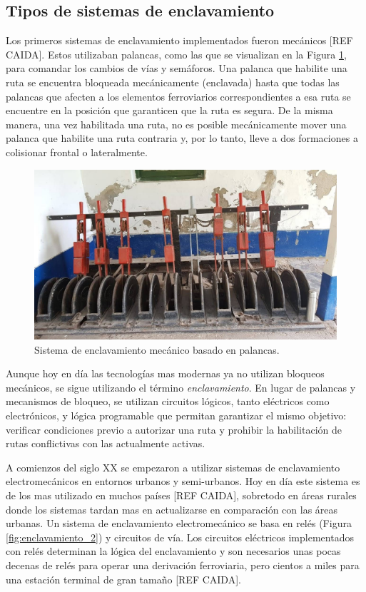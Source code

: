 \subsection{Tipos de sistemas de enclavamiento}

    Los primeros sistemas de enclavamiento implementados fueron mecánicos [REF CAIDA]. Estos utilizaban palancas, como las que se visualizan en la Figura \ref{fig:enclavamiento_1}, para comandar los cambios de vías y semáforos. Una palanca que habilite una ruta se encuentra bloqueada mecánicamente (enclavada) hasta que todas las palancas que afecten a los elementos ferroviarios correspondientes a esa ruta se encuentre en la posición que garanticen que la ruta es segura. De la misma manera, una vez habilitada una ruta, no es posible mecánicamente mover una palanca que habilite una ruta contraria y, por lo tanto, lleve a dos formaciones a colisionar frontal o lateralmente.
    
        \begin{figure}[H]
            \centering
            \includegraphics[width=1\textwidth]{Figuras/palancas.jpg}
            \centering\caption{Sistema de enclavamiento mecánico basado en palancas.}
            \label{fig:enclavamiento_1}
        \end{figure}

    Aunque hoy en día las tecnologías mas modernas ya no utilizan bloqueos mecánicos, se sigue utilizando el término \textit{enclavamiento}. En lugar de palancas y mecanismos de bloqueo, se utilizan circuitos lógicos, tanto eléctricos como electrónicos, y lógica programable que permitan garantizar el mismo objetivo: verificar condiciones previo a autorizar una ruta y prohibir la habilitación de rutas conflictivas con las actualmente activas.

    A comienzos del siglo XX se empezaron a utilizar sistemas de enclavamiento electromecánicos en entornos urbanos y semi-urbanos. Hoy en día este sistema es de los mas utilizado en muchos países [REF CAIDA], sobretodo en áreas rurales donde los sistemas tardan mas en actualizarse en comparación con las áreas urbanas. Un sistema de enclavamiento electromecánico se basa en relés (Figura \ref{fig:enclavamiento_2}) y circuitos de vía. Los circuitos eléctricos implementados con relés determinan la lógica del enclavamiento y son necesarios unas pocas decenas de relés para operar una derivación ferroviaria, pero cientos a miles para una estación terminal de gran tamaño [REF CAIDA].

